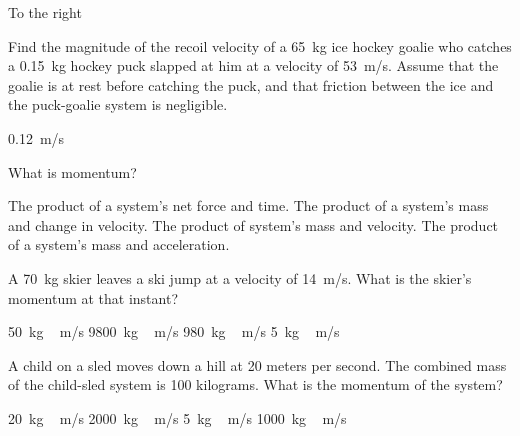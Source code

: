 \documentclass[]{exam}
\begin{document}
\begin{questions}
\begin{solution}
To the right
\end{solution}


\question \label{jA5zHj}
Find the magnitude of the recoil velocity of a \SI{65}{kg} ice hockey goalie who catches a \SI{0.15}{kg} hockey puck slapped at him at a velocity of \SI{53}{m/s}. Assume that the goalie is at rest before catching the puck, and that friction between the ice and the puck-goalie system is negligible.

\begin{solution}
\SI{0.12}{m/s}
\end{solution}













\clearpage

\question
What is momentum?

\begin{randomizechoices}
\choice The product of a system's net force and time.
\choice The product of a system's mass and change in velocity.
\correctchoice The product of system's mass and velocity.
\choice The product of a system's mass and acceleration.
\end{randomizechoices}

\question
A \SI{70}{kg} skier leaves a ski jump at a velocity of \SI{14}{m/s}. What is the skier's momentum at that instant?

\begin{randomizechoices}
\choice \SI{50}{kg\,m/s}
\choice \SI{9800}{kg\,m/s}
\correctchoice \SI{980}{kg\,m/s}
\choice \SI{5}{kg\,m/s}
\end{randomizechoices}

\question
A child on a sled moves down a hill at 20 meters per second. The combined mass of the child-sled system is 100 kilograms. What is the momentum of the system?

\begin{randomizechoices}
\choice \SI{20}{kg\,m/s}
\correctchoice \SI{2000}{kg\,m/s}
\choice \SI{5}{kg\,m/s}
\choice \SI{1000}{kg\,m/s}
\end{randomizechoices}


\end{questions}
\end{document}
